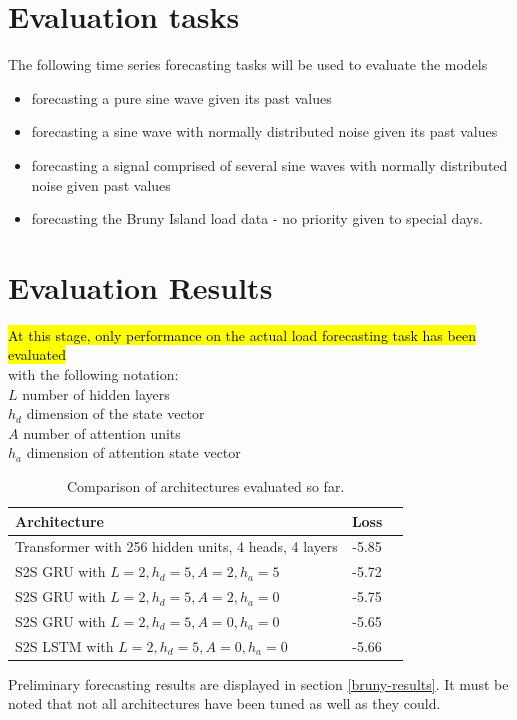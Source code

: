 \section{Evaluation tasks}
The following time series forecasting tasks will be used to evaluate the models
\begin{itemize}
	\item forecasting a pure sine wave given its past values
	\item forecasting a sine wave with normally distributed noise given its past values
	\item forecasting a signal comprised of several sine waves with normally distributed noise given past values
	\item forecasting the Bruny Island load data - no priority given to special days.
\end{itemize}

\section{Evaluation Results}
\hl{At this stage, only performance on the actual load forecasting task has been evaluated} \\
with the following notation: \\
$L$ number of hidden layers \\
$h_d$ dimension of the state vector \\
$A$ number of attention units \\
$h_a$ dimension of attention state vector


\begin{table}[htbp]
	\centering
	\begin{tabular}{lcl}
		\hline
		\textbf{Architecture} & \textbf{Loss} & \\
		\hline
		Transformer with 256 hidden units, 4 heads, 4 layers   &  -5.85  &  \\
		S2S GRU with  $L = 2, h_d = 5, A=2, h_a=5$ &  -5.72  &  \\
		S2S GRU with  $L = 2, h_d = 5, A=2, h_a=0$  &  -5.75  &  \\
		S2S GRU with  $L = 2, h_d = 5, A=0, h_a=0$  &  -5.65  &  \\
		S2S LSTM with  $L = 2, h_d = 5, A=0, h_a=0$  &  -5.66  &  \\
		\hline
	\end{tabular}
	\caption{Comparison of architectures evaluated so far.}
	\label{tab:architecture_comparison}
\end{table}

Preliminary forecasting results are displayed in section \ref{bruny-results}.
It must be noted that not all architectures have been tuned as well as they could.



	
